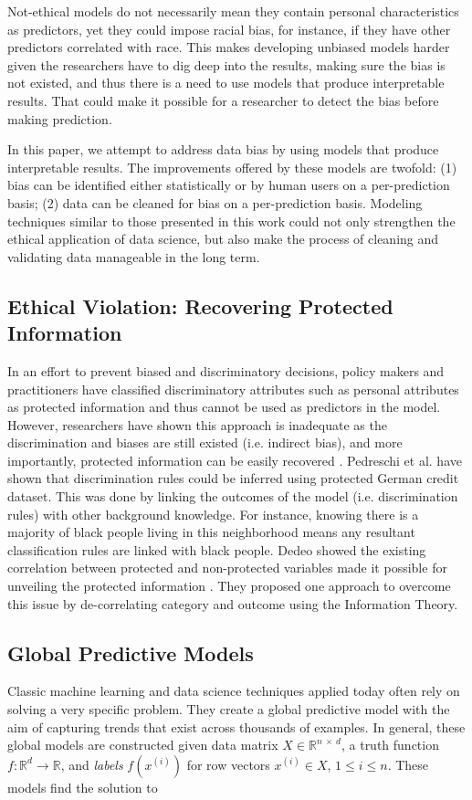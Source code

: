 \documentclass[sigconf]{acmart}
\begin{document}
Not-ethical models do not necessarily mean they contain personal characteristics as predictors, yet they could impose racial bias, for instance, if they have other predictors correlated with race. This makes developing unbiased models harder given the researchers have to dig deep into the results, making sure the bias is not existed, and thus there is a need to use models that produce interpretable results. That could make it possible for a researcher to detect the bias before making prediction.

In this paper, we attempt to address data bias by using models that produce interpretable results. The improvements offered by these models are twofold: (1) bias can be identified either statistically or by human users on a per-prediction basis; (2) data can be cleaned for bias on a per-prediction basis. Modeling techniques similar to those presented in this work could not only strengthen the ethical application of data science, but also make the process of cleaning and validating data manageable in the long term.

\subsection{Ethical Violation: Recovering Protected Information}

In an effort to prevent biased and discriminatory decisions, policy makers and practitioners have classified discriminatory attributes such as personal attributes as protected information and thus cannot be used as predictors in the model. However, researchers have shown this approach is inadequate as the discrimination and biases are still existed (i.e. indirect bias), and more importantly, protected information can be easily recovered \cite{dedeo2014wrong,pedreshi2008discrimination}. Pedreschi et al. have shown that discrimination rules could be inferred using protected German credit dataset. This was done by linking the outcomes of the model (i.e. discrimination rules) with other background knowledge. For instance, knowing there is a majority of black people living in this neighborhood means any resultant classification  rules are linked with black people. Dedeo showed the existing correlation between protected and non-protected variables made it possible for unveiling the protected information \cite{dedeo2014wrong}. They proposed one approach to overcome this issue by de-correlating category and outcome using the Information Theory.

\subsection{Global Predictive Models}
Classic machine learning and data science techniques applied today often rely on solving a very specific problem. They create a global predictive model with the aim of capturing trends that exist across thousands of examples. In general, these global models are constructed given data matrix $X \in \mathbb{R}^{n\ \times\ d}$, a truth function $f: \mathbb{R}^d \rightarrow \mathbb{R}$, and \textit{labels} $f(x^{(i)})$ for row vectors $x^{(i)} \in X$, $1 \leq i \leq n$. These models find the solution to
\end{document}
